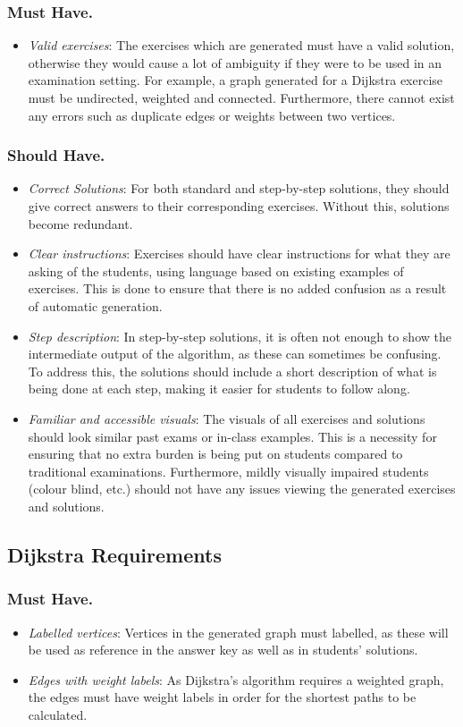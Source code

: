 \documentclass{l4proj}
\begin{document}
\subsubsection{Must Have.}
\begin{itemize}
	\item
	\emph{Valid exercises}: The exercises which are generated must have a valid solution, otherwise they would cause a lot of ambiguity if they were to be used in an examination setting. For example, a graph generated for a Dijkstra exercise must be undirected, weighted and connected. Furthermore, there cannot exist any errors such as duplicate edges or weights between two vertices.
\end{itemize}
\subsubsection{Should Have.}
\begin{itemize}
	\item
	\emph{Correct Solutions}: For both standard and step-by-step solutions, they should give correct answers to their corresponding exercises. Without this, solutions become redundant.
	\item
	\emph{Clear instructions}: Exercises should have clear instructions for what they are asking of the students, using language based on existing examples of exercises. This is done to ensure that there is no added confusion as a result of automatic generation.
	\item
	\emph{Step description}: In step-by-step solutions, it is often not enough to show the intermediate output of the algorithm, as these can sometimes be confusing. To address this, the solutions should include a short description of what is being done at each step, making it easier for students to follow along. 
	\item
	\emph{Familiar and accessible visuals}: The visuals of all exercises and solutions should look similar past exams or in-class examples. This is a necessity for ensuring that no extra burden is being put on students compared to traditional examinations. Furthermore, mildly visually impaired students (colour blind, etc.) should not have any issues viewing the generated exercises and solutions.
\end{itemize}
\subsection{Dijkstra Requirements}
\label{sec:dijkr}
\subsubsection{Must Have.}
\begin{itemize}
	\item
	\emph{Labelled vertices}: Vertices in the generated graph must labelled, as these will be used as reference in the answer key as well as in students' solutions. 
	\item
	\emph{Edges with weight labels}: As Dijkstra's algorithm requires a weighted graph, the edges must have weight labels in order for the shortest paths to be calculated.
\end{itemize}
\end{document}
